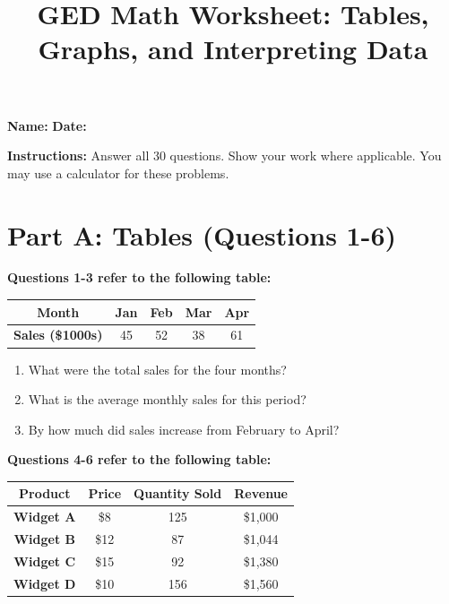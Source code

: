 \documentclass[12pt]{article}
\title{\textbf{GED Math Worksheet: Tables, Graphs, and Interpreting Data}}
\author{}
\date{}
\begin{document}
\maketitle

\noindent\textbf{Name:} \underline{\hspace{3in}} \quad \textbf{Date:} \underline{\hspace{2in}}

\vspace{0.2in}

\noindent\textbf{Instructions:} Answer all 30 questions. Show your work where applicable. You may use a calculator for these problems.

\vspace{0.3in}

\section*{Part A: Tables (Questions 1-6)}

\noindent\textbf{Questions 1-3 refer to the following table:}

\begin{center}
\begin{tabular}{|c|c|c|c|c|}
\hline
\textbf{Month} & \textbf{Jan} & \textbf{Feb} & \textbf{Mar} & \textbf{Apr} \\
\hline
\textbf{Sales (\$1000s)} & 45 & 52 & 38 & 61 \\
\hline
\end{tabular}
\end{center}

\begin{enumerate}
\item What were the total sales for the four months?
\vspace{0.8in}

\item What is the average monthly sales for this period?
\vspace{0.8in}

\item By how much did sales increase from February to April?
\vspace{0.8in}
\end{enumerate}

\noindent\textbf{Questions 4-6 refer to the following table:}

\begin{center}
\begin{tabular}{|c|c|c|c|}
\hline
\textbf{Product} & \textbf{Price} & \textbf{Quantity Sold} & \textbf{Revenue} \\
\hline
\textbf{Widget A} & \$8 & 125 & \$1,000 \\
\hline
\textbf{Widget B} & \$12 & 87 & \$1,044 \\
\hline
\textbf{Widget C} & \$15 & 92 & \$1,380 \\
\hline
\textbf{Widget D} & \$10 & 156 & \$1,560 \\
\hline
\end{tabular}
\end{center}
\end{document}
